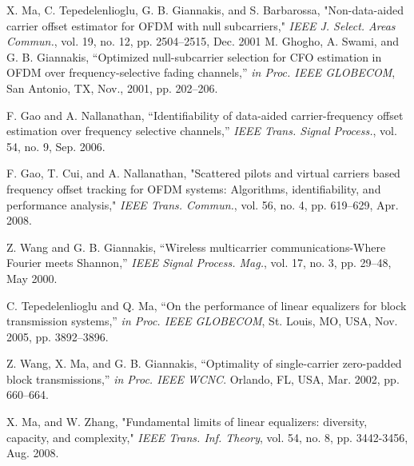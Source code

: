 \documentclass[journal]{IEEEtran}
\begin{document}
\begin{thebibliography}{1}
X. Ma, C. Tepedelenlioglu, G. B. Giannakis,
and S. Barbarossa, "Non-data-aided carrier
offset estimator for OFDM with null
subcarriers," \textit{IEEE J. Select. Areas Commun.},
vol. 19, no. 12, pp. 2504–2515, Dec. 2001
 M. Ghogho, A. Swami, and G. B. Giannakis, “Optimized
null-subcarrier selection for CFO estimation in OFDM
over frequency-selective fading channels,” \textit{in Proc. IEEE GLOBECOM}, San Antonio, TX, Nov., 2001, pp. 202–206.

F. Gao and A. Nallanathan, “Identifiability of data-aided carrier-frequency offset estimation over frequency selective channels,” \textit{IEEE
Trans. Signal Process.}, vol. 54, no. 9, Sep. 2006.

F. Gao, T. Cui, and A. Nallanathan, "Scattered pilots and virtual carriers
based frequency offset tracking for OFDM systems: Algorithms, identifiability, and performance analysis," \textit{IEEE Trans. Commun.}, vol. 56, no. 4,
pp. 619–629, Apr. 2008.



 Z. Wang and G. B. Giannakis, “Wireless multicarrier communications-Where Fourier meets Shannon,” \textit{IEEE Signal Process. Mag.}, vol. 17, no. 3, pp. 29–48, May 2000.

 C. Tepedelenlioglu and Q. Ma, “On the performance of linear
equalizers for block transmission systems,” \textit{in Proc. IEEE GLOBECOM}, St. Louis, MO, USA, Nov. 2005, pp. 3892–3896.

 Z. Wang, X. Ma, and G. B. Giannakis, “Optimality of single-carrier zero-padded block transmissions,” \textit{in Proc. IEEE WCNC}. Orlando, FL, USA, Mar. 2002, pp. 660–664.

X. Ma, and W. Zhang, "Fundamental limits of linear equalizers: diversity, capacity, and complexity," \textit{IEEE Trans. Inf. Theory}, vol. 54, no. 8, pp. 3442-3456, Aug. 2008.

  
\end{thebibliography}
\end{document}
